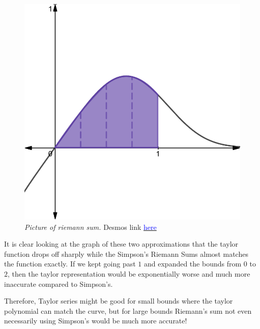 \documentclass[12pt]{article}
\begin{document}
\begin{figure}[H]
  \begin{center}
    \includegraphics[scale=.3]{riemann.png}
    \caption{\textit{Picture of riemann sum.} Desmos link \href{https://www.desmos.com/calculator/vytmchsw3b}{\textcolor{blue}{here}}}
  \end{center}
\end{figure}

It is clear looking at the graph of these two approximations that the taylor function drops off sharply while the Simpson's Riemann Sums almost matches the function exactly. If we kept going past $1$ and expanded the bounds from $0$ to $2$, then the taylor representation would be exponentially worse and much more inaccurate compared to Simpson's.

Therefore, Taylor series might be good for small bounds where the taylor polynomial can match the curve, but for large bounds Riemann's sum not even necessarily using Simpson's would be much more accurate!

\end{document}
